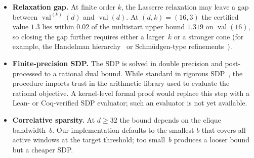\documentclass[11pt, letterpaper]{article}
\theoremstyle{paperplain}
\theoremstyle{paperdef}
\newcommand{\val}{\operatorname{val}}
\begin{document}
\begin{itemize}
  \item \textbf{Relaxation gap.}
    At finite order $k$, the Lasserre relaxation may leave a gap
    between $\val^{(k)}(d)$ and $\val(d)$.  At $(d,k)=(16,3)$ the
    certified value $1.3$ lies within $0.02$ of the multistart upper
    bound $1.319$ on $\val(16)$, so closing the gap further requires
    either a larger~$k$ or a stronger cone (for example, the
    Handelman hierarchy~\cite{Handelman1988} or
    Schm\"udgen-type refinements~\cite{Schmudgen1991}).
  \item \textbf{Finite-precision SDP.}
    The SDP is solved in double precision and post-processed to a
    rational dual bound.  While standard in rigorous
    SDP~\cite{JanssonChaykinKeil2008}, the procedure imports trust in
    the arithmetic library used to evaluate the rational objective.
    A kernel-level formal proof would replace this step with a Lean-
    or Coq-verified SDP evaluator; such an evaluator is not yet
    available.
  \item \textbf{Correlative sparsity.}
    At $d\ge 32$ the bound depends on the clique bandwidth~$b$.  Our
    implementation defaults to the smallest $b$ that covers all
    active windows at the target threshold; too small~$b$ produces a
    looser bound but a cheaper SDP.
\end{itemize}





\end{document}
